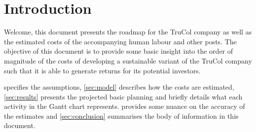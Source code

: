 \section{Introduction}\label{sec:intro}
Welcome, this document presents the roadmap for the TruCol company as well as the estimated costs of the accompanying human labour and other posts. The objective of this document is to provide some basic insight into the order of magnitude of the costs of developing a sustainable variant of the TruCol company such that it is able to generate returns for its potential investors.

 specifies the assumptions, \cref{sec:model} describes how the costs are estimated, \cref{sec:results} presents the projected basic planning and briefly details what each activity in the Gantt chart represents.  provides some nuance on the accuracy of the estimates and \cref{sec:conclusion} summarises the body of information in this document.